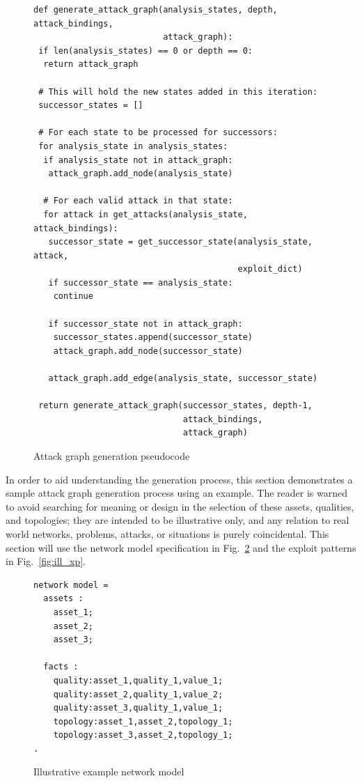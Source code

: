 \begin{figure}
\begin{lstlisting}
def generate_attack_graph(analysis_states, depth, attack_bindings,
                          attack_graph):
 if len(analysis_states) == 0 or depth == 0:
  return attack_graph
 
 # This will hold the new states added in this iteration:
 successor_states = []

 # For each state to be processed for successors:
 for analysis_state in analysis_states:
  if analysis_state not in attack_graph:
   attack_graph.add_node(analysis_state)

  # For each valid attack in that state:
  for attack in get_attacks(analysis_state, attack_bindings):
   successor_state = get_successor_state(analysis_state, attack,
                                         exploit_dict)
   if successor_state == analysis_state:
    continue
       
   if successor_state not in attack_graph:
    successor_states.append(successor_state)
    attack_graph.add_node(successor_state)
   
   attack_graph.add_edge(analysis_state, successor_state)
      
 return generate_attack_graph(successor_states, depth-1,
                              attack_bindings,
                              attack_graph)
\end{lstlisting}
\caption{Attack graph generation pseudocode}
\label{fig:ag_generation_pc}
\end{figure}
In order to aid understanding the generation process, this section demonstrates a
sample attack graph generation process using an example. The reader is warned to
avoid searching for meaning or design in the selection of these assets, qualities,
and topologies; they are intended to be illustrative only, and any relation to 
real world networks, problems, attacks, or situations is purely coincidental.
This section will use the network model specification in Fig.~\ref{fig:ill_nm}
and the exploit patterns in Fig.~\ref{fig:ill_xp}.
\begin{figure}
\begin{lstlisting}
network model = 
  assets :
    asset_1;
    asset_2;
    asset_3;

  facts :
    quality:asset_1,quality_1,value_1;
    quality:asset_2,quality_1,value_2;
    quality:asset_3,quality_1,value_1;
    topology:asset_1,asset_2,topology_1;
    topology:asset_3,asset_2,topology_1;
.
\end{lstlisting}
\caption{Illustrative example network model}
\label{fig:ill_nm}
\end{figure}

